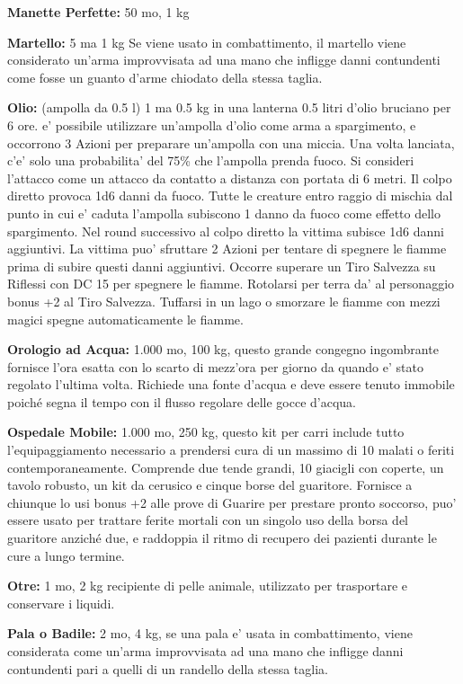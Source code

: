 \documentclass[a4paper,11pt,twoside,openany]{dndbook}
\begin{document}
{\textbf{Manette Perfette:} 50 mo, 1 kg

\textbf{Martello:} 5 ma 1 kg Se viene usato in combattimento, il martello viene considerato un'arma improvvisata ad una mano che infligge danni contundenti come fosse un guanto d'arme chiodato della stessa taglia.

\textbf{Olio:} (ampolla da 0.5 l) 1 ma 0.5 kg in una lanterna 0.5 litri d'olio bruciano per 6 ore. e' possibile utilizzare un'ampolla d'olio come arma a spargimento, e occorrono 3 Azioni per preparare un'ampolla con una miccia. Una volta lanciata, c'e' solo una probabilita' del 75\% che l'ampolla prenda fuoco. Si consideri l'attacco come un attacco da contatto a distanza con portata di 6 metri. Il colpo diretto provoca 1d6 danni da fuoco. Tutte le creature entro raggio di mischia dal punto in cui e' caduta l'ampolla subiscono 1 danno da fuoco come effetto dello spargimento. Nel round successivo al colpo diretto la vittima subisce 1d6 danni aggiuntivi. La vittima puo' sfruttare 2 Azioni per tentare di spegnere le fiamme prima di subire questi danni aggiuntivi. Occorre superare un Tiro Salvezza su Riflessi con DC 15 per spegnere le fiamme. Rotolarsi per terra da' al personaggio bonus +2 al Tiro Salvezza. Tuffarsi in un lago o smorzare le fiamme con mezzi magici spegne automaticamente le fiamme.

\textbf{Orologio ad Acqua:} 1.000 mo, 100 kg, questo grande congegno ingombrante fornisce l'ora esatta con lo scarto di mezz'ora per giorno da quando e' stato regolato l'ultima volta. Richiede una fonte d'acqua e deve essere tenuto immobile poiché segna il tempo con il flusso regolare delle gocce d'acqua.

\textbf{Ospedale Mobile:} 1.000 mo, 250 kg, questo kit per carri include tutto l'equipaggiamento necessario a prendersi cura di un massimo di 10 malati o feriti contemporaneamente. Comprende due tende grandi, 10 giacigli con coperte, un tavolo robusto, un kit da cerusico e cinque borse del guaritore. Fornisce a chiunque lo usi bonus +2 alle prove di Guarire per prestare pronto soccorso, puo' essere usato per trattare ferite mortali con un singolo uso della borsa del guaritore anziché due, e raddoppia il ritmo di recupero dei pazienti durante le cure a lungo termine.

\textbf{Otre:} 1 mo, 2 kg recipiente di pelle animale, utilizzato per trasportare e conservare i liquidi.

\textbf{Pala o Badile:} 2 mo, 4 kg, se una pala e' usata in combattimento, viene considerata come un'arma improvvisata ad una mano che infligge danni contundenti pari a quelli di un randello della stessa taglia. 

}
\end{document}
